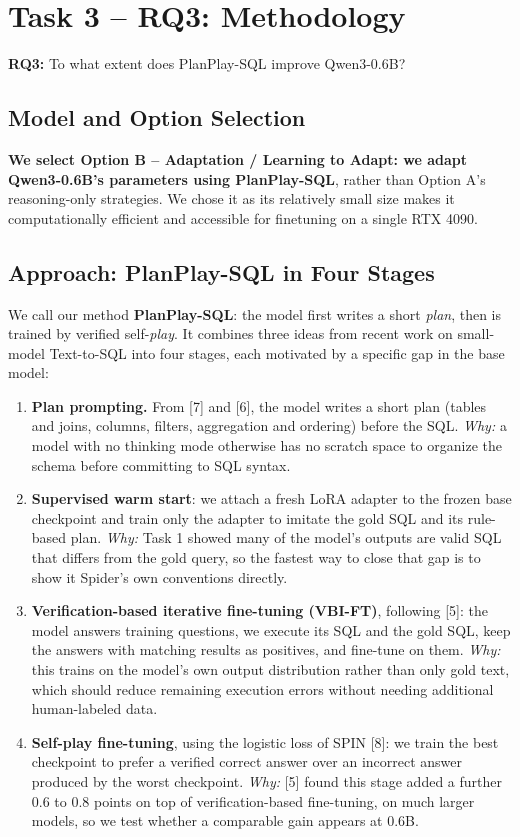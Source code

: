 
\section{Task 3 -- RQ3: Methodology}
\label{sec:rq3-methodology}

\textbf{RQ3:} To what extent does PlanPlay-SQL improve Qwen3-0.6B?

\subsection{Model and Option Selection}
\label{sec:rq3-model-selection}

\textbf{We select Option B -- Adaptation / Learning to Adapt: we adapt Qwen3-0.6B's parameters using PlanPlay-SQL}, rather than Option A's reasoning-only strategies. We chose it as its relatively small size makes it computationally efficient and accessible for finetuning on a single RTX 4090.

\subsection{Approach: PlanPlay-SQL in Four Stages}
\label{sec:rq3-approach}

We call our method \textbf{PlanPlay-SQL}: the model first writes a short \emph{plan}, then is trained by verified self-\emph{play}. It combines three ideas from recent work on small-model Text-to-SQL into four stages, each motivated by a specific gap in the base model:

\begin{enumerate}
\item \textbf{Plan prompting.} From [7] and [6], the model writes a short plan (tables and joins, columns, filters, aggregation and ordering) before the SQL. \emph{Why:} a model with no thinking mode otherwise has no scratch space to organize the schema before committing to SQL syntax.
\item \textbf{Supervised warm start}: we attach a fresh LoRA adapter to the frozen base checkpoint and train only the adapter to imitate the gold SQL and its rule-based plan. \emph{Why:} Task 1 showed many of the model's outputs are valid SQL that differs from the gold query, so the fastest way to close that gap is to show it Spider's own conventions directly.
\item \textbf{Verification-based iterative fine-tuning (VBI-FT)}, following [5]: the model answers training questions, we execute its SQL and the gold SQL, keep the answers with matching results as positives, and fine-tune on them. \emph{Why:} this trains on the model's own output distribution rather than only gold text, which should reduce remaining execution errors without needing additional human-labeled data.
\item \textbf{Self-play fine-tuning}, using the logistic loss of SPIN [8]: we train the best checkpoint to prefer a verified correct answer over an incorrect answer produced by the worst checkpoint. \emph{Why:} [5] found this stage added a further 0.6 to 0.8 points on top of verification-based fine-tuning, on much larger models, so we test whether a comparable gain appears at 0.6B.
\end{enumerate}

